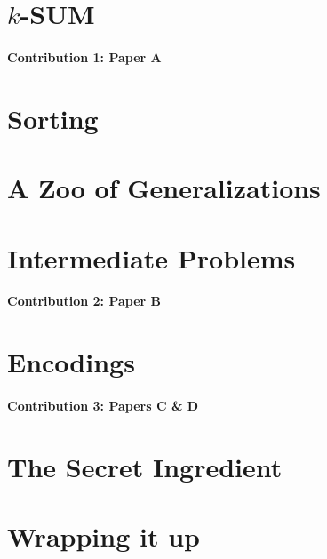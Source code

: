 \section*{\(k\)-SUM}

\paragraph{Contribution 1: Paper A}


\section*{Sorting}


\section*{A Zoo of Generalizations}





\section*{Intermediate Problems}

\paragraph{Contribution 2: Paper B}


\section*{Encodings}

\paragraph{Contribution 3: Papers C \& D}


\section*{The Secret Ingredient}


\section*{Wrapping it up}

